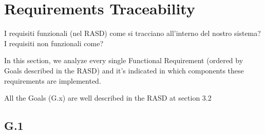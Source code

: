 \documentclass[../../dd.tex]{subfiles}
\begin{document}
	\chapter{Requirements Traceability}
		I requisiti funzionali (nel RASD) come si tracciano all'interno del nostro sistema?
		I requisiti non funzionali come?

		In this section, we analyze every single Functional Requirement (ordered by Goals described in the RASD) and it's indicated in which components these requirements are implemented.

		All the Goals (G.x) are well described in the RASD at section 3.2

		\section{G.1}
			
\end{document}
